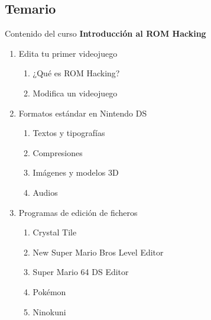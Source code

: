 \subsection{Temario}
\begin{frame}{Contenido del curso}
    \centering
    \textbf{Introducción al ROM Hacking}
    \begin{enumerate}
        \item<+-> Edita tu primer videojuego
        \begin{enumerate}
            \item ¿Qué es ROM Hacking?
            \item Modifica un videojuego
        \end{enumerate}
        \item<+-> Formatos estándar en Nintendo DS
        \begin{enumerate}
            \item Textos y tipografías
            \item Compresiones
            \item Imágenes y modelos 3D
            \item Audios
        \end{enumerate}
        \item<+-> Programas de edición de ficheros
        \begin{enumerate}
            \item Crystal Tile
            \item New Super Mario Bros Level Editor
            \item Super Mario 64 DS Editor
            \item Pokémon
            \item Ninokuni
        \end{enumerate}
    \end{enumerate}
\end{frame}

